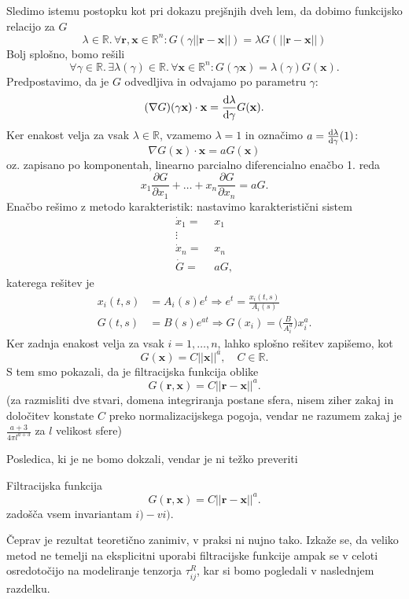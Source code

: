 \documentclass[mat2, tisk]{fmfdelo}
\newcommand{\R}{\mathbb R}
\newcommand{\bd}{\textbf}
\begin{document}
\begin{dokaz}
Sledimo istemu postopku kot pri dokazu prejšnjih dveh lem, da dobimo funkcijsko relacijo za $G$
$$
\lambda\in \R.\, \forall\bd{r}, \bd{x}\in \R^n: G(\gamma||\bd{r} - \bd{x}||) = \lambda G(||\bd{r} - \bd{x}||)
$$
Bolj splošno, bomo rešili 
$$
\forall \gamma\in \R.\, \exists \lambda(\gamma)\in \R.\, \forall \bd{x}\in \R^n: G(\gamma \bd{x}) = \lambda(\gamma) G(\bd{x}).
$$
Predpostavimo, da je $G$ odvedljiva in odvajamo po parametru $\gamma$:
$$
(\nabla G)(\gamma \bd{x}) \cdot \bd{x} = \frac{\dif \lambda}{\dif \gamma} G(\bd{x}).
$$
Ker enakost velja za vsak $\lambda \in \R$, vzamemo $\lambda = 1$ in označimo $a = \frac{\dif \lambda}{\dif \gamma}(1)$:
$$
\nabla G(\bd{x}) \cdot \bd{x} = a G(\bd{x})
$$
oz. zapisano po komponentah, linearno parcialno diferencialno enačbo 1. reda
$$
x_1\frac{\partial G}{\partial x_1} + \dots + x_n\frac{\partial G}{\partial x_n} = aG.
$$
Enačbo rešimo z metodo karakteristik: nastavimo karakteristični sistem 
\begin{align*}
\dot{x}_1 =&\,\, x_1 \\
\!\!\!\!\vdots \\
\dot{x}_n = &\,\, x_n \\
\dot{G} =&\,\, aG,
\end{align*}
katerega rešitev je 
\begin{align*}
x_i(t, s) &= A_i(s) e^t \Longrightarrow e^t = \frac{x_i(t, s)}{A_i(s)}\\
G(t, s) &= B(s) e^{at} \Longrightarrow G(x_i) = \Big(\frac{B}{A_i^a}\Big) x_i^a.
\end{align*}
Ker zadnja enakost velja za vsak $i=1,\dots, n$, lahko splošno rešitev zapišemo, kot 
$$
G(\bd{x}) = C ||\bd{x}||^a, \quad C\in \R.
$$
S tem smo pokazali, da je filtracijska funkcija oblike 
$$
G(\bd{r}, \bd{x}) = C||\bd{r} - \bd{x}||^a.
$$
(za razmisliti dve stvari, domena integriranja postane sfera, nisem ziher zakaj in 
določitev konstate $C$ preko normalizacijskega pogoja, vendar ne razumem zakaj je $\frac{a+3}{4\pi l^{a+3}} $
za $l$ velikost sfere)
\end{dokaz}

Posledica, ki je ne bomo dokzali, vendar je ni težko preveriti

\begin{posledica}
Filtracijska funkcija 
$$
G(\bd{r}, \bd{x}) = C||\bd{r} - \bd{x}||^a.
$$
zadošča vsem invariantam $i) - vi)$.
\end{posledica}

Čeprav je rezultat teoretično zanimiv, v praksi ni nujno tako. Izkaže se, da veliko 
metod ne temelji na eksplicitni uporabi filtracijske funkcije ampak se v celoti osredotočijo 
na modeliranje tenzorja $\tau_{ij}^R$, kar si bomo pogledali v naslednjem razdelku. 
\end{document}
